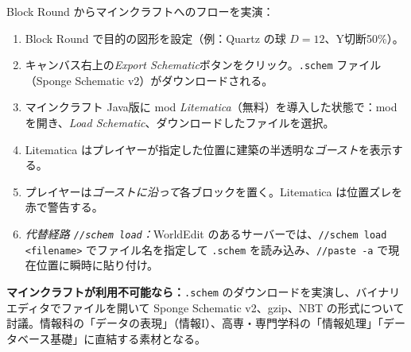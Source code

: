 \documentclass[12pt,a4paper]{scrartcl}
\newcommand{\cmd}[1]{\textcolor{earth}{\texttt{\small #1}}}
\newcommand{\tempo}[1]{\textnormal{\footnotesize\color{bg!90!white}\textsf{#1}}}
\begin{document}
\begin{katsudou}[5.2 --- 出力と読み込み \quad\tempo{15分}]\label{at:52}
Block Round からマインクラフトへのフローを実演：

\begin{enumerate}[leftmargin=1.5em,itemsep=0.2em,topsep=0.3em]
  \item Block Round で目的の図形を設定（例：Quartz の球 $D = 12$、Y切断50\%）。
  \item キャンバス右上の\emph{Export Schematic}ボタンをクリック。\texttt{.schem} ファイル（Sponge Schematic v2）がダウンロードされる。
  \item マインクラフト Java版に mod \emph{Litematica}（無料）を導入した状態で：mod を開き、\emph{Load Schematic}、ダウンロードしたファイルを選択。
  \item Litematica はプレイヤーが指定した位置に建築の半透明な\emph{ゴースト}を表示する。
  \item プレイヤーは\emph{ゴーストに沿って}各ブロックを置く。Litematica は位置ズレを赤で警告する。
  \item \emph{代替経路 \cmd{//schem load}：}WorldEdit のあるサーバーでは、\cmd{//schem load <filename>} でファイル名を指定して \texttt{.schem} を読み込み、\cmd{//paste -a} で現在位置に瞬時に貼り付け。
\end{enumerate}

\textbf{マインクラフトが利用不可能なら：}\texttt{.schem} のダウンロードを実演し、バイナリエディタでファイルを開いて Sponge Schematic v2、gzip、NBT の形式について討議。情報科の「データの表現」（情報I）、高専・専門学科の「情報処理」「データベース基礎」に直結する素材となる。
\end{katsudou}
\end{document}
